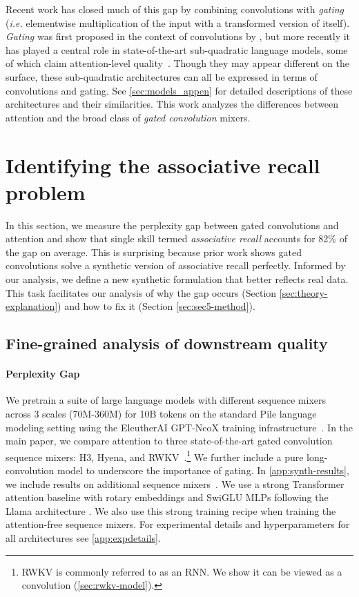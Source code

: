 Recent work has closed much of this gap by combining convolutions with \textit{gating} (\textit{i.e.} elementwise multiplication of the input with a transformed version of itself). \textit{Gating} was first proposed in the context of convolutions by \citet{dauphin2017language}, but more recently it has played a central role in state-of-the-art sub-quadratic language models, some of which claim attention-level quality~\cite[inter alia]{dao2022hungry, wang2022pretraining, poli2023hyena, peng2023rwkv,zhai2021attention,fu2023monarch}. Though they may appear different on the surface, these sub-quadratic architectures can all be expressed in terms of convolutions and gating. See \ref{sec:models_appen} for detailed descriptions of these architectures and their similarities. This work analyzes the differences between attention and the broad class of \textit{gated convolution} mixers.

\section{Identifying the associative recall problem}

\label{sec:sec3-downstream}

In this section, we measure the perplexity gap between gated convolutions and attention and show that single skill termed \textit{associative recall} accounts for 82\% of the gap on average. This is surprising because prior work shows gated convolutions solve a synthetic version of associative recall perfectly. Informed by our analysis, we define a new synthetic formulation that better reflects real data. This task facilitates our analysis of why the gap occurs (Section \ref{sec:theory-explanation}) and how to fix it (Section \ref{sec:sec5-method}).

\subsection{Fine-grained analysis of downstream quality}
\paragraph{Perplexity Gap} We pretrain a suite of large language models with different sequence mixers across 3  scales (70M-360M) for 10B tokens on the standard Pile language modeling setting using the EleutherAI GPT-NeoX training infrastructure~\citep{pile, gpt-neox-library}. In the main paper, we compare attention to three state-of-the-art gated convolution sequence mixers:  H3, Hyena, and RWKV~\citep{dao2022hungry,poli2023hyena,peng2023rwkv}.\footnote{RWKV is commonly referred to as an RNN. We show it can be viewed as a convolution (\ref{sec:rwkv-model}).} 
We further include a pure long-convolution model to underscore the importance of gating. In \ref{app:synth-results}, we include results on additional sequence mixers~\citep{hasani2022liquid,sun2023retentive}. We use a strong Transformer attention baseline with rotary embeddings and SwiGLU MLPs following the Llama architecture \citep{touvron2023llama}. We also use this strong training recipe when training the attention-free sequence mixers. For experimental details and hyperparameters for all architectures see \ref{app:expdetails}.

